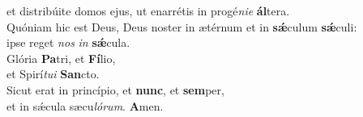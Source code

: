 \evenverse et distribúite domos ejus, ut enarrétis in progé\textit{ni}\textit{e} \textbf{ál}tera.\\
\oddverse Quóniam hic est Deus, Deus noster in ætérnum et in \textbf{sǽ}culum \textbf{sǽ}culi:~\*\\
\oddverse ipse reget \textit{nos} \textit{in} \textbf{sǽ}cula.\\
\evenverse Glória \textbf{Pa}tri, et \textbf{Fí}lio,~\*\\
\evenverse et Spirí\textit{tu}\textit{i} \textbf{San}cto.\\
\oddverse Sicut erat in princípio, et \textbf{nunc}, et \textbf{sem}per,~\*\\
\oddverse et in sǽcula sæcu\textit{ló}\textit{rum}. \textbf{A}men.\\
